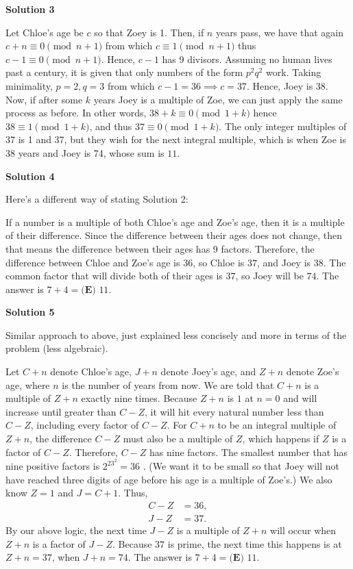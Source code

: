 \begin{enumerate}
 



\textbf{Solution 3}

Let Chloe's age be $c$ so that Zoey is 1. Then, if $n$ years pass, we have that again $c+n \equiv 0 \pmod{n+1}$ from which $c \equiv 1 \pmod{n+1}$ thus $c - 1 \equiv 0 \pmod{n+1}$. Hence, $c-1$ has 9 divisors. Assuming no human lives past a century, it is given that only numbers of the form $p^2q^2$ work. Taking minimality, $p = 2, q = 3$ from which $c-1 = 36 \implies c = 37$. Hence, Joey is 38. Now, if after some $k$ years Joey is a multiple of Zoe, we can just apply the same process as before. In other words, $38+k \equiv 0 \pmod{1+k}$ hence $38 \equiv 1 \pmod{1+k}$, and thus $37 \equiv 0 \pmod{1+k}$. The only integer multiples of 37 is 1 and 37, but they wish for the next integral multiple, which is when Zoe is 38 years and Joey is 74, whose sum is $\boxed{11}$.

 



\textbf{Solution 4}

Here's a different way of stating Solution 2:

 If a number is a multiple of both Chloe's age and Zoe's age, then it is a multiple of their difference. Since the difference between their ages does not change, then that means the difference between their ages has $9$ factors. Therefore, the difference between Chloe and Zoe's age is $36$, so Chloe is $37$, and Joey is $38$. The common factor that will divide both of their ages is $37$, so Joey will be $74$. The answer is $7 + 4 =  \boxed{\textbf{(E) }11}$.

 



\textbf{Solution 5}

Similar approach to above, just explained less concisely and more in terms of the problem (less algebraic).

 Let $C+n$ denote Chloe's age, $J+n$ denote Joey's age, and $Z+n$ denote Zoe's age, where $n$ is the number of years from now. We are told that $C+n$ is a multiple of $Z+n$ exactly nine times. Because $Z+n$ is $1$ at $n=0$ and will increase until greater than $C-Z$, it will hit every natural number less than $C-Z$, including every factor of $C-Z$. For $C+n$ to be an integral multiple of $Z+n$, the difference $C-Z$ must also be a multiple of $Z$, which happens if $Z$ is a factor of $C-Z$. Therefore, $C-Z$ has nine factors. The smallest number that has nine positive factors is $2^23^2=36$ . (We want it to be small so that Joey will not have reached three digits of age before his age is a multiple of Zoe's.) We also know $Z=1$ and $J=C+1$. Thus,
 \begin{align*} C-Z&=36, \\ J-Z&=37. \end{align*}
By our above logic, the next time $J-Z$ is a multiple of $Z+n$ will occur when $Z+n$ is a factor of $J-Z$. Because $37$ is prime, the next time this happens is at $Z+n=37$, when $J+n=74$. The answer is $7+4=\boxed{\textbf{(E) }11}$.


\end{enumerate}
